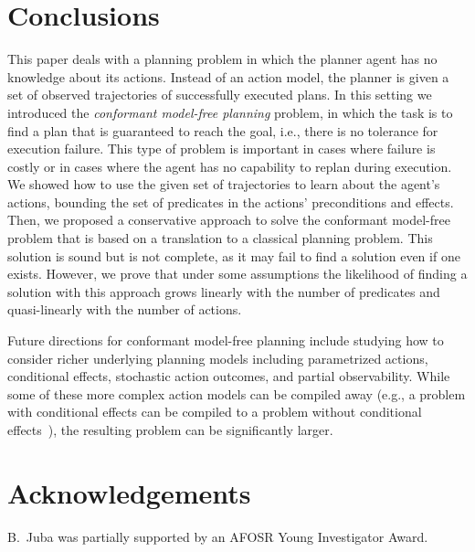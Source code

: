\documentclass{article}
\begin{document}
	
	
	\section{Conclusions}
	This paper deals with a planning problem in which the planner agent has no knowledge about its actions. Instead of an action model, the planner is given a set of observed trajectories of successfully executed plans. 	In this setting we introduced the {\em conformant model-free planning} problem, in which the task is to find a plan that is guaranteed to reach the goal, i.e., there is no tolerance for execution failure. This type of problem is important in cases where failure is costly or in cases where the agent has no capability to replan during execution. 
	We showed how to use the given set of trajectories to learn
	about the agent's actions, bounding the set of predicates in the actions'  preconditions and effects. Then, we proposed a conservative approach to solve the conformant model-free problem that is based on a translation to a classical planning problem. This solution is sound but is not complete, as it may fail to find a solution even if one exists. However, we prove that under some assumptions the likelihood of finding a solution with this approach grows linearly with the number of predicates and quasi-linearly with the number of actions. 
	
	
	Future directions for conformant model-free planning include studying how to consider richer underlying planning models including parametrized actions, conditional effects, stochastic action outcomes, and partial observability. While some of these more complex action models can be compiled away (e.g., a problem with conditional effects can be compiled to a problem without conditional effects~\cite{nebel2000compilability}), the resulting problem can be significantly larger.   
	
	
	
	\section*{Acknowledgements}
	B.~Juba was partially supported by an AFOSR Young Investigator Award.
	
	
	
	
\end{document}
